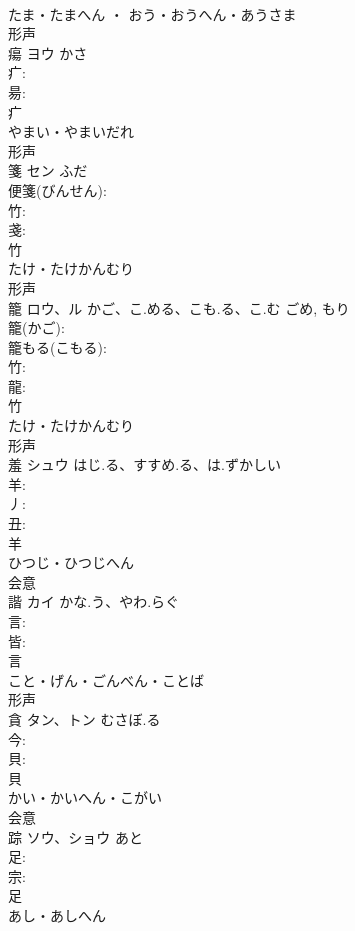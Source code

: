 \documentclass[8pt]{extreport}
\begin{document}
\begin{CJK}{UTF8}{min}
\\	たま・たまへん ・ おう・おうへん・あうさま	
\\	形声 
\\	瘍	ヨウ	かさ		
\\	疒: 
\\	昜: 
\\	疒	
\\	やまい・やまいだれ	
\\	形声 
\\	箋	セン	ふだ		
\\	便箋(びんせん): 
\\	竹: 
\\	戔: 
\\	竹	
\\	たけ・たけかんむり	
\\	形声 
\\	籠	ロウ、ル	かご、こ.める、こも.る、こ.む	ごめ, もり	
\\	籠(かご): 
\\	籠もる(こもる): 
\\	竹: 
\\	龍: 
\\	竹	
\\	たけ・たけかんむり	
\\	形声 
\\	羞	シュウ	はじ.る、すすめ.る、は.ずかしい		
\\	羊: 
\\	丿: 
\\	丑: 
\\	羊	
\\	ひつじ・ひつじへん	
\\	会意 
\\	諧	カイ	かな.う、やわ.らぐ		
\\	言: 
\\	皆: 
\\	言	
\\	こと・げん・ごんべん・ことば	
\\	形声 
\\	貪	タン、トン	むさぼ.る		
\\	今: 
\\	貝: 
\\	貝	
\\	かい・かいへん・こがい	
\\	会意 
\\	踪	ソウ、ショウ	あと		
\\	足: 
\\	宗: 
\\	足	
\\	あし・あしへん	

\end{CJK}
\end{document}
